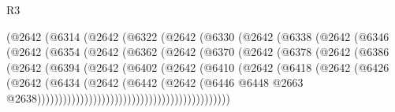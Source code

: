 \begin{lexlean}{R3}
\begin{coremodule}
                      (@2642
                        (@6314
                          (@2642
                            (@6322
                              (@2642
                                (@6330
                                  (@2642
                                    (@6338
                                      (@2642
                                        (@6346
                                          (@2642
                                            (@6354
                                              (@2642
                                                (@6362
                                                  (@2642
                                                    (@6370
                                                      (@2642
                                                        (@6378
                                                          (@2642
                                                            (@6386
                                                              (@2642
                                                                (@6394
                                                                  (@2642
                                                                    (@6402
                                                                      (@2642
                                                                        (@6410
                                                                          (@2642
                                                                            (@6418
                                                                              (@2642
                                                                                (@6426
                                                                                  (@2642
                                                                                    (@6434
                                                                                      (@2642
                                                                                        (@6442
                                                                                          (@2642
                                                                                            (@6446
                                                                                              @6448
                                                                                              @2663
                                                                                              @2638)))))))))))))))))))))))))))))))))))))))))))))

\end{coremodule}
\end{lexlean}
